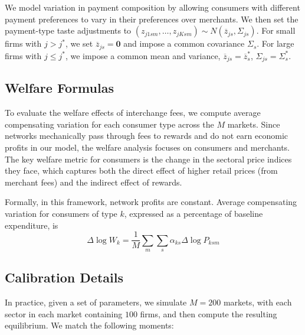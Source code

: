 \documentclass[11pt,english]{article}
\theoremstyle{remark}
\begin{document}
We model variation in payment composition by allowing consumers with different payment preferences to vary in their preferences over merchants.
We then set the payment-type taste adjustments to $\left(z_{j1sm},\dots,z_{jKsm}\right)\sim N\left(\overline{z}_{js},\Sigma_{js}\right)$.
For small firms with $j>j^{*}$, we set $\overline{z}_{js}=\mathbf{0}$ and impose a common covariance $\Sigma_{s}$.
For large firms with $j\leq j^{*}$, we impose a common mean and variance, $\overline{z}_{js}=\overline{z}_{s}^{*}$, $\Sigma_{js}=\Sigma_{s}^{*}$.

\subsection{Welfare Formulas}

To evaluate the welfare effects of interchange fees, we compute average compensating variation for each consumer type across the $M$ markets.
Since networks mechanically pass through fees to rewards and do not earn economic profits in our model, the welfare analysis focuses on consumers and merchants.
The key welfare metric for consumers is the change in the sectoral price indices they face, which captures both the direct effect of higher retail prices (from merchant fees) and the indirect effect of rewards.

Formally, in this framework, network profits are constant.
Average compensating variation for consumers of type $k$, expressed as a percentage of baseline expenditure, is
\[
\Delta\log W_{k}=\frac{1}{M}\sum_{m}\sum_{s}\alpha_{ks}\Delta\log P_{ksm}
\]

\subsection{Calibration Details}

In practice, given a set of parameters, we simulate $M=200$ markets, with each sector in each market containing $100$ firms, and then compute the resulting equilibrium.
We match the following moments:
\end{document}
